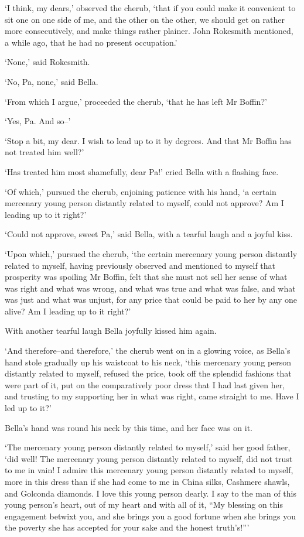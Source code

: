 ‘I think, my dears,’ observed the cherub, ‘that if you could make it
convenient to sit one on one side of me, and the other on the other, we
should get on rather more consecutively, and make things rather
plainer. John Rokesmith mentioned, a while ago, that he had no present
occupation.’

‘None,’ said Rokesmith.

‘No, Pa, none,’ said Bella.

‘From which I argue,’ proceeded the cherub, ‘that he has left Mr
Boffin?’

‘Yes, Pa. And so--’

‘Stop a bit, my dear. I wish to lead up to it by degrees. And that Mr
Boffin has not treated him well?’

‘Has treated him most shamefully, dear Pa!’ cried Bella with a flashing
face.

‘Of which,’ pursued the cherub, enjoining patience with his hand, ‘a
certain mercenary young person distantly related to myself, could not
approve? Am I leading up to it right?’

‘Could not approve, sweet Pa,’ said Bella, with a tearful laugh and a
joyful kiss.

‘Upon which,’ pursued the cherub, ‘the certain mercenary young person
distantly related to myself, having previously observed and mentioned
to myself that prosperity was spoiling Mr Boffin, felt that she must not
sell her sense of what was right and what was wrong, and what was true
and what was false, and what was just and what was unjust, for any
price that could be paid to her by any one alive? Am I leading up to it
right?’

With another tearful laugh Bella joyfully kissed him again.

‘And therefore--and therefore,’ the cherub went on in a glowing voice,
as Bella’s hand stole gradually up his waistcoat to his neck, ‘this
mercenary young person distantly related to myself, refused the
price, took off the splendid fashions that were part of it, put on the
comparatively poor dress that I had last given her, and trusting to my
supporting her in what was right, came straight to me. Have I led up to
it?’

Bella’s hand was round his neck by this time, and her face was on it.

‘The mercenary young person distantly related to myself,’ said her
good father, ‘did well! The mercenary young person distantly related
to myself, did not trust to me in vain! I admire this mercenary young
person distantly related to myself, more in this dress than if she had
come to me in China silks, Cashmere shawls, and Golconda diamonds. I
love this young person dearly. I say to the man of this young person’s
heart, out of my heart and with all of it, “My blessing on this
engagement betwixt you, and she brings you a good fortune when she
brings you the poverty she has accepted for your sake and the honest
truth’s!”’

